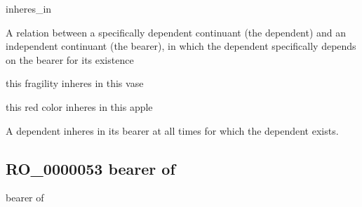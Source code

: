 \documentclass[letterpaper,10pt,english]{sphinxmanual}
\begin{document}
\begin{sphinxShadowBox}

\sphinxAtStartPar
inheres\_in
\end{sphinxShadowBox}

\begin{sphinxShadowBox}

\sphinxAtStartPar
{}
\end{sphinxShadowBox}

\begin{sphinxShadowBox}

\sphinxAtStartPar
A relation between a specifically dependent continuant (the dependent) and an independent continuant (the bearer), in which the dependent specifically depends on the bearer for its existence
\end{sphinxShadowBox}

\begin{sphinxShadowBox}

\sphinxAtStartPar
this fragility inheres in this vase

\sphinxAtStartPar
this red color inheres in this apple
\end{sphinxShadowBox}

\begin{sphinxShadowBox}

\sphinxAtStartPar
A dependent inheres in its bearer at all times for which the dependent exists.
\end{sphinxShadowBox}

\begin{sphinxShadowBox}

\sphinxAtStartPar
{}
\end{sphinxShadowBox}
\begin{quote}

\ignorespaces \end{quote}


\subsection{RO\_0000053 \sphinxhyphen{} bearer of}
\label{\detokenize{doc-RO_0000053:ro-0000053-bearer-of}}\label{\detokenize{doc-RO_0000053:index-0}}\label{\detokenize{doc-RO_0000053::doc}}
\begin{sphinxShadowBox}

\sphinxAtStartPar
bearer of
\end{sphinxShadowBox}
\end{document}
